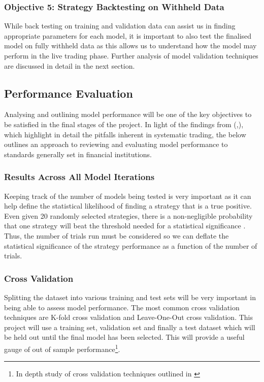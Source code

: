 \documentclass[11pt]{article}
\begin{document}
\subsubsection{Objective 5: Strategy Backtesting on Withheld Data}
While back testing on training and validation data can assist us in finding appropriate parameters for each model, it is important to also test the finalised model on fully withheld data as this allows us to understand how the model may perform in the live trading phase. Further analysis of model validation techniques are discussed in detail in the next section.

\subsection{Performance Evaluation}
Analysing and outlining model performance will be one of the key objectives to be satisfied in the final stages of the project.
In light of the findings from (\cite{Arnott2018},\cite{Bailey2013}), which highlight in detail the pitfalls inherent in systematic trading, the below outlines an approach to reviewing and evaluating model performance to standards generally set in financial institutions.

\subsubsection{Results Across All Model Iterations} 
Keeping track of the number of models being tested is very important as it can help define the statistical likelihood of finding a strategy that is a true positive. Even given 20 randomly selected strategies, there is a non-negligible probability that one strategy will beat the threshold needed for a statistical significance \cite{Arnott2018}. Thus, the number of trials run must be considered so we can deflate the statistical significance of the strategy performance as a function of the number of trials\cite{Bailey2011}.
\subsubsection{Cross Validation}
Splitting the dataset into various training and test sets will be very important in being able to assess model performance. The most common cross validation techniques are K-fold cross validation and Leave-One-Out cross validation. This project will use a training set, validation set and finally a test dataset which will be held out until the final model has been selected. This will provide a useful gauge of out of sample performance\footnote{In depth study of cross validation techniques outlined in \cite{Bergmeir2012}}.
\end{document}

